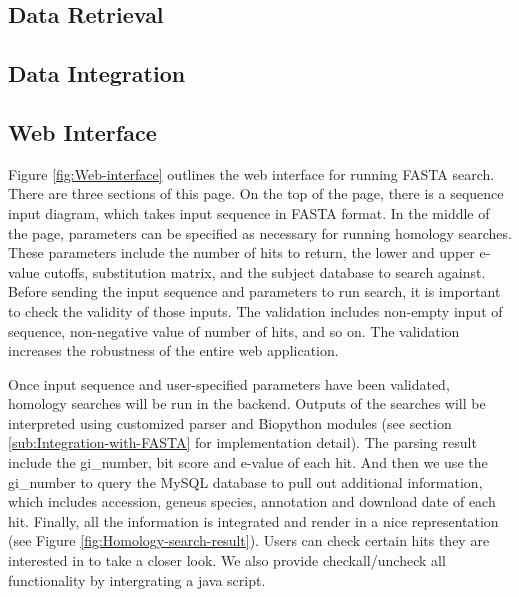 \documentclass[11pt,letterpaper,twoside,english]{article}
\begin{document}
\subsection{\label{sub:Data-Retrieval}Data Retrieval}




\subsection{Data Integration}




\subsection{Web Interface}







Figure \ref{fig:Web-interface} outlines the web interface for running
FASTA search. There are three sections of this page. On the top of
the page, there is a sequence input diagram, which takes input sequence
in FASTA format. In the middle of the page, parameters can be specified
as necessary for running homology searches. These parameters include
the number of hits to return, the lower and upper e-value cutoffs,
substitution matrix, and the subject database to search against. Before
sending the input sequence and parameters to run search, it is important
to check the validity of those inputs. The validation includes non-empty
input of sequence, non-negative value of number of hits, and so on.
The validation increases the robustness of the entire web application.

Once input sequence and user-specified parameters have been validated,
homology searches will be run in the backend. Outputs of the searches
will be interpreted using customized parser and Biopython modules
(see section \ref{sub:Integration-with-FASTA} for implementation
detail). The parsing result include the gi\_number, bit score and
e-value of each hit. And then we use the gi\_number to query the MySQL
database to pull out additional information, which includes accession,
geneus species, annotation and download date of each hit. Finally,
all the information is integrated and render in a nice representation
(see Figure \ref{fig:Homology-search-result}). Users can check certain
hits they are interested in to take a closer look. We also provide
checkall/uncheck all functionality by intergrating a java script.
\end{document}
